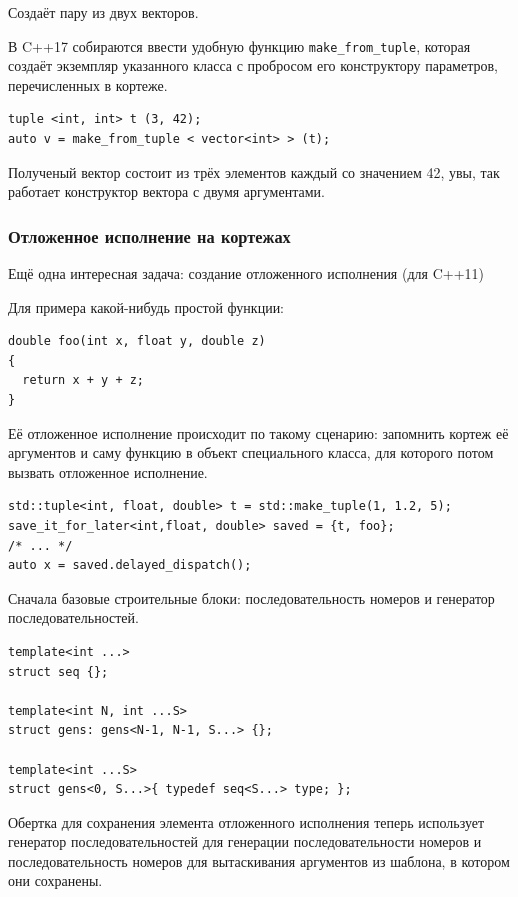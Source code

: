 \documentclass[a4paper,12pt,oneside]{article}
\begin{document}
Создаёт пару из двух векторов.

В C++17 собираются ввести удобную функцию \lstinline!make_from_tuple!, которая создаёт экземпляр указанного класса с пробросом его конструктору параметров, перечисленных в кортеже.

\begin{lstlisting}
tuple <int, int> t (3, 42);
auto v = make_from_tuple < vector<int> > (t);
\end{lstlisting}

Полученый вектор состоит из трёх элементов каждый со значением 42, увы, так работает конструктор вектора с двумя аргументами.

\subsubsection{Отложенное исполнение на кортежах}\label{DelayedExec}

Ещё одна интересная задача: создание отложенного исполнения (для C++11)

Для примера какой-нибудь простой функции:

\begin{lstlisting}
double foo(int x, float y, double z)
{
  return x + y + z;
}
\end{lstlisting}

Её отложенное исполнение происходит по такому сценарию: запомнить кортеж её аргументов и саму функцию в объект специального класса, для которого потом вызвать отложенное исполнение.

\begin{lstlisting}
std::tuple<int, float, double> t = std::make_tuple(1, 1.2, 5);
save_it_for_later<int,float, double> saved = {t, foo};
/* ... */
auto x = saved.delayed_dispatch();
\end{lstlisting}

Сначала базовые строительные блоки: последовательность номеров и генератор последовательностей.

\begin{lstlisting}
template<int ...> 
struct seq {};

template<int N, int ...S> 
struct gens: gens<N-1, N-1, S...> {};

template<int ...S> 
struct gens<0, S...>{ typedef seq<S...> type; };
\end{lstlisting}

Обертка для сохранения элемента отложенного исполнения теперь использует генератор последовательностей для генерации последовательности номеров и последовательность номеров для вытаскивания аргументов из шаблона, в котором они сохранены.
\end{document}
